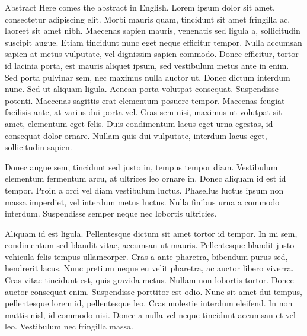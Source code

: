 \begin{coverpage}{Abstract}
Here comes the abstract in English. Lorem ipsum dolor sit amet, consectetur adipiscing elit. Morbi mauris quam, tincidunt sit amet fringilla ac, laoreet sit amet nibh. Maecenas sapien mauris, venenatis sed ligula a, sollicitudin suscipit augue. Etiam tincidunt nunc eget neque efficitur tempor. Nulla accumsan sapien at metus vulputate, vel dignissim sapien commodo. Donec efficitur, tortor id lacinia porta, est mauris aliquet ipsum, sed vestibulum metus ante in enim. Sed porta pulvinar sem, nec maximus nulla auctor ut. Donec dictum interdum nunc. Sed ut aliquam ligula. Aenean porta volutpat consequat. Suspendisse potenti. Maecenas sagittis erat elementum posuere tempor. Maecenas feugiat facilisis ante, at varius dui porta vel. Cras sem nisi, maximus ut volutpat sit amet, elementum eget felis. Duis condimentum lacus eget urna egestas, id consequat dolor ornare. Nullam quis dui vulputate, interdum lacus eget, sollicitudin sapien.

Donec augue sem, tincidunt sed justo in, tempus tempor diam. Vestibulum elementum fermentum arcu, at ultrices leo ornare in. Donec aliquam id est id tempor. Proin a orci vel diam vestibulum luctus. Phasellus luctus ipsum non massa imperdiet, vel interdum metus luctus. Nulla finibus urna a commodo interdum. Suspendisse semper neque nec lobortis ultricies.

Aliquam id est ligula. Pellentesque dictum sit amet tortor id tempor. In mi sem, condimentum sed blandit vitae, accumsan ut mauris. Pellentesque blandit justo vehicula felis tempus ullamcorper. Cras a ante pharetra, bibendum purus sed, hendrerit lacus. Nunc pretium neque eu velit pharetra, ac auctor libero viverra. Cras vitae tincidunt est, quis gravida metus. Nullam non lobortis tortor. Donec auctor consequat enim. Suspendisse porttitor est odio. Nunc sit amet dui tempus, pellentesque lorem id, pellentesque leo. Cras molestie interdum eleifend. In non mattis nisl, id commodo nisi. Donec a nulla vel neque tincidunt accumsan et vel leo. Vestibulum nec fringilla massa.
\end{coverpage}

